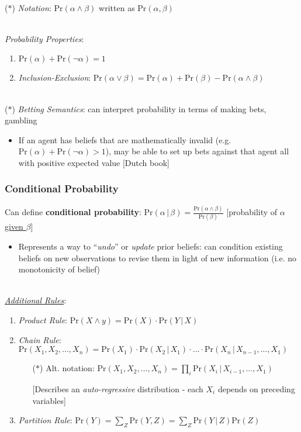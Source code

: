 \documentclass[12pt]{extarticle}
\theoremstyle{definition}
\theoremstyle{remark}
\newcommand{\pstart}[0]{\noindent}
\newcommand{\newp}[0]{~\\ \pstart}
\newcommand{\prob}[1]{\text{Pr}(#1)}
\newcommand{\cond}[2]{#1\,\vert\,#2}
\begin{document}
\newp
($\ast$) \textit{Notation}: $\prob{\alpha\land\beta}$ written as $\prob{\alpha,\beta}$

\newp
\textit{Probability Properties}: \begin{enumerate}
    \item $\prob{\alpha}+\prob{\neg\alpha}=1$
    \item \textit{Inclusion-Exclusion}: $\prob{\alpha \lor \beta}=\prob{\alpha}+\prob{\beta}-\prob{\alpha\land\beta}$
\end{enumerate}

\newp
($\ast$) \textit{Betting Semantics}: can interpret probability in terms of making bets, gambling \begin{itemize}
    \item If an agent has beliefs that are mathematically invalid (e.g. $\prob{\alpha}+\prob{\neg\alpha}>1$), may be able to set up bets against that agent all with positive expected value [Dutch book]
\end{itemize}

\subsubsection{Conditional Probability}
Can define \textbf{conditional probability}: $\prob{\cond{\alpha}{\beta}}=\frac{\prob{\alpha\land\beta}}{\prob{\beta}}$ [probability of $\alpha$ \ul{given $\beta$}] \begin{itemize}
    \item Represents a way to ``\textit{undo}'' or \textit{update} prior beliefs: can condition existing beliefs on new observations to revise them in light of new information (i.e. no monotonicity of belief)
\end{itemize}

\newp
\ul{\textit{Additional Rules}}: \begin{enumerate}
    \item \textit{Product Rule}: $\prob{X\land y}=\prob{X}\cdot\prob{\cond{Y}{X}}$
    \item \textit{Chain Rule}: $\prob{X_1,X_2,\hdots,X_n}=\prob{X_1}\cdot\prob{\cond{X_2}{X_1}}\cdot\hdots\cdot\prob{\cond{X_n}{X_{n-1},\hdots,X_1}}$ \begin{itemize}
        \item[($\ast$)] Alt. notation: $\prob{X_1,X_2,\hdots,X_n}=\prod_{i}\prob{\cond{X_i}{X_{i-1},\hdots,X_1}}$ 

        [Describes an \textit{auto-regressive} distribution - each $X_i$ depends on preceding variables]
    \end{itemize}
    \item \textit{Partition Rule}: $\prob{Y}=\sum_Z\prob{Y,Z}=\sum_Z\prob{\cond{Y}{Z}}\prob{Z}$
\end{enumerate}
\end{document}

